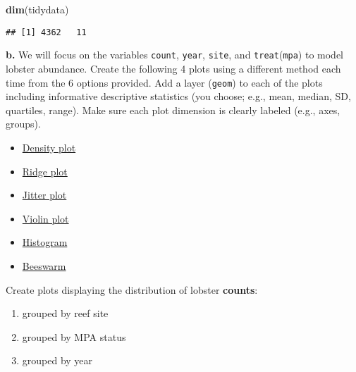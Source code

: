 \documentclass[
]{article}
\newenvironment{Shaded}{\begin{snugshade}}{\end{snugshade}}
\newcommand{\FunctionTok}[1]{\textcolor[rgb]{0.13,0.29,0.53}{\textbf{#1}}}
\newcommand{\NormalTok}[1]{#1}
\providecommand{\tightlist}{%
  \setlength{\itemsep}{0pt}\setlength{\parskip}{0pt}}
\begin{document}
\begin{Shaded}
\begin{Highlighting}[]
\FunctionTok{dim}\NormalTok{(tidydata)}
\end{Highlighting}
\end{Shaded}

\begin{verbatim}
## [1] 4362   11
\end{verbatim}

\textbf{b.} We will focus on the variables \texttt{count},
\texttt{year}, \texttt{site}, and \texttt{treat}(\texttt{mpa}) to model
lobster abundance. Create the following 4 plots using a different method
each time from the 6 options provided. Add a layer (\texttt{geom}) to
each of the plots including informative descriptive statistics (you
choose; e.g., mean, median, SD, quartiles, range). Make sure each plot
dimension is clearly labeled (e.g., axes, groups).

\begin{itemize}
\tightlist
\item
  \href{https://r-charts.com/distribution/density-plot-group-ggplot2}{Density
  plot}
\item
  \href{https://r-charts.com/distribution/ggridges/}{Ridge plot}
\item
  \href{https://ggplot2.tidyverse.org/reference/geom_jitter.html}{Jitter
  plot}
\item
  \href{https://r-charts.com/distribution/violin-plot-group-ggplot2}{Violin
  plot}
\item
  \href{https://r-charts.com/distribution/histogram-density-ggplot2/}{Histogram}
\item
  \href{https://r-charts.com/distribution/beeswarm/}{Beeswarm}
\end{itemize}

Create plots displaying the distribution of lobster \textbf{counts}:

\begin{enumerate}
\def\labelenumi{\arabic{enumi})}
\tightlist
\item
  grouped by reef site\\
\item
  grouped by MPA status
\item
  grouped by year
\end{enumerate}
\end{document}
